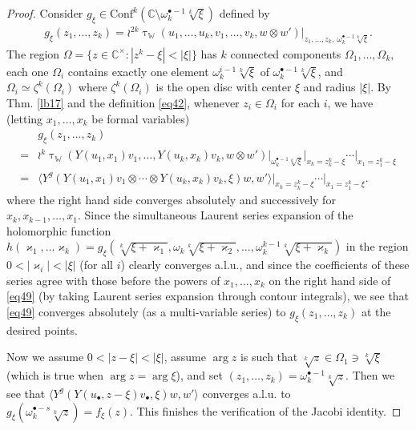 \documentclass[12pt,a4paper,notitlepage]{article}
\theoremstyle{definition}
\theoremstyle{plain}
\newcommand{\Conf}{\mathrm{Conf}}
\newcommand{\bk}[1]{\langle {#1}\rangle}
\newcommand{\blt}{\bullet}
\newcommand{\Wbb}{\mathbb W}
\newcommand{\Cbb}{\mathbb C}
\numberwithin{equation}{section}
\begin{document}
\begin{proof}
Consider $g_\xi\in\Conf^k(\Cbb\setminus\omega_k^{\blt-1}\sqrt[k]{\xi})$ defined by
\begin{align*}
g_\xi(z_1,\dots,z_k)=\wr^{2k}\uptau_\Wbb(u_1,\dots,u_k,v_1,\dots,v_k,w\otimes w')\Big|_{z_1,\dots,z_k,~\omega_k^{\blt-1}\sqrt[k]{\xi}}.	
\end{align*}
The region $\Omega=\{z\in\Cbb^\times:|z^k-\xi|<|\xi|\}$ has $k$ connected components $\Omega_1,\dots,\Omega_k$, each one $\Omega_i$ contains exactly one element $\omega_k^{i-1}\sqrt[k]{\xi}$ of $\omega_k^{\blt-1}\sqrt[k]{\xi}$, and $\Omega_i\simeq\zeta^k(\Omega_i)$ where $\zeta^k(\Omega_i)$ is the open disc with center $\xi$ and radius $|\xi|$. By Thm. \ref{lb17} and the definition \eqref{eq42}, whenever $z_i\in\Omega_i$ for each $i$, we have  (letting $x_1,\dots,x_k$ be formal variables)
\begin{align}
&g_\xi(z_1,\dots,z_k)\nonumber\\
=&\wr^k\uptau_\Wbb(Y(u_1,x_1)v_1,\dots,Y(u_k,x_k)v_k,w\otimes w')\Big|_{\omega_k^{\blt-1}\sqrt[k]{\xi}}\Big|_{x_k=z_k^k-\xi}\cdots \Big|_{x_1=z_1^k-\xi}\nonumber\\
=&\bk{Y^g(Y(u_1,x_1)v_1\otimes\cdots\otimes Y(u_k,x_k)v_k,\xi)w,w'}\Big|_{x_k=z_k^k-\xi}\cdots \Big|_{x_1=z_1^k-\xi}.\label{eq49}
\end{align}
where the right hand side converges absolutely and successively for $x_k,x_{k-1},\dots,x_1$. Since the simultaneous Laurent series expansion of the holomorphic function $h(\varkappa_1,\dots\varkappa_k)=g_\xi(\sqrt[k]{\xi+\varkappa_1},\omega_k\sqrt[k]{\xi+\varkappa_2},\dots,\omega_k^{k-1} \sqrt[k]{\xi+\varkappa_k})$ in the region $0<|\varkappa_i|<|\xi|$ (for all $i$) clearly converges a.l.u., and since the coefficients of these series agree with those before the powers of $x_1,\dots,x_k$ on the right hand side of \eqref{eq49} (by taking Laurent series expansion through contour integrals), we see that \eqref{eq49} converges absolutely (as a multi-variable series) to $g_\xi(z_1,\dots,z_k)$  at the desired points. 

Now we  assume $0<|z-\xi|<|\xi|$, assume  $\arg z$ is such that $\sqrt[k]{z}\in\Omega_1\ni\sqrt[k]{\xi}$ (which is true when $\arg z=\arg \xi$), and  set $(z_1,\dots,z_k)=\omega_k^{\blt-1}\sqrt[k]{z}$. Then we see that $\bk{Y^g(Y(u_\blt,z-\xi)v_\blt,\xi)w,w'}$ converges a.l.u. to $g_\xi(\omega_k^{\blt-s}\sqrt[k]{z})=f_\xi(z)$. This finishes the verification of the Jacobi identity.
\end{proof}
\end{document}
